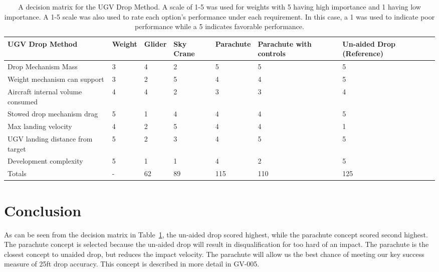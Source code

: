 \documentclass[]{auvsi_doc}
\begin{document}
\begin{table} [H]
\caption{A decision matrix for the UGV Drop Method. A scale of 1-5 was used for weights with 5 having high importance and 1 having low importance. A 1-5 scale was also used to rate each option’s performance under each requirement. In this case, a 1 was used to indicate poor performance while a 5 indicates favorable performance.}
\label{cont_cs_tab}
	\begin{tabular}{|>{\raggedright}p{2.5cm}| l | l | l | l | p{2.5cm} | p{2.5cm} |}
\hline

UGV Drop Method&Weight&Glider&Sky Crane& Parachute& Parachute with controls& Un-aided Drop (Reference) \\
\hline
Drop Mechanism Mass&                                3&4&2&5&5&5 \\
\hline
Weight mechanism can support&                       3&2&5&4&4&5 \\
\hline
Aircraft internal volume consumed&                  4&4&2&3&3&4 \\
\hline
Stowed drop mechanism drag&                         5&1&4&4&4&5 \\
\hline
Max landing velocity&                               4&2&5&4&4&1 \\
\hline
UGV landing distance from target&                   5&2&3&4&5&5 \\
\hline
Development complexity&                             5&1&1&4&2&5 \\
\hline
Totals&                                             -&62&89&115&110&125 \\
\hline

\end{tabular}
\end{table}


\section{Conclusion}
As can be seen from the decision matrix in Table~\ref{cont_cs_tab}, the un-aided drop scored highest, while the parachute concept scored second highest. The parachute concept is selected because the un-aided drop will result in disqualification for too hard of an impact. The parachute is the closest concept to unaided drop, but reduces the impact velocity. The parachute will allow us the best chance of meeting our key success measure of 25ft drop accuracy. This concept is described in more detail in GV-005.
\end{document}
